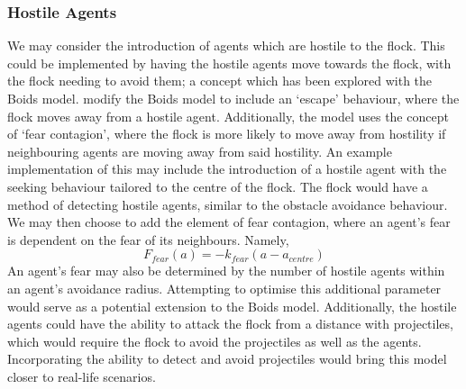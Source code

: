 \documentclass[12pt]{article}
\begin{document}
\subsubsection{Hostile Agents}
We may consider the introduction of agents which are hostile to the flock. This could be implemented by having the hostile agents move towards the flock, with the flock needing to avoid them; a concept which has been explored with the Boids model\cite{chen2008application}. \citet{delgado2007use} modify the Boids model to include an `escape' behaviour, where the flock moves away from a hostile agent. Additionally, the model uses the concept of `fear contagion', where the flock is more likely to move away from hostility if neighbouring agents are moving away from said hostility. An example implementation of this may include the introduction of a hostile agent with the seeking behaviour tailored to the centre of the flock. The flock would have a method of detecting hostile agents, similar to the obstacle avoidance behaviour. We may then choose to add the element of fear contagion, where an agent's fear is dependent on the fear of its neighbours. Namely,
\begin{equation}
    F_{fear}(a) = -k_{fear}(a-a_{centre})
\end{equation}
An agent's fear may also be determined by the number of hostile agents within an agent's avoidance radius. Attempting to optimise this additional parameter would serve as a potential extension to the Boids model. Additionally, the hostile agents could have the ability to attack the flock from a distance with projectiles, which would require the flock to avoid the projectiles as well as the agents. Incorporating the ability to detect and avoid projectiles would bring this model closer to real-life scenarios.
\end{document}
